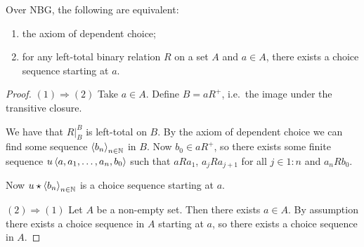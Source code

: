 \begin{lemma} \label{freedomFirstElementChoiceSequence}
Over NBG, the following are equivalent:
\begin{enumerate}
\item the axiom of dependent choice;
\item for any left-total binary relation $R$ on a set $A$ and $a\in A$, there exists a choice sequence starting at $a$.
\end{enumerate}
\end{lemma}
\begin{proof}
$\boxed{(1)\Rightarrow (2)}$ Take $a\in A$. Define $B = aR^+$, i.e.\ the image under the transitive closure.

We have that $R|^B_B$ is left-total on $B$. By the axiom of dependent choice we can find some sequence $\left\langle b_n \right\rangle_{n\in \mathbb{N}}$ in $B$. Now $b_0\in aR^+$, so there exists some finite sequence $u\left\langle a, a_1, \ldots, a_n, b_0 \right\rangle$ such that $aRa_1$,  $a_{j}Ra_{j+1}$ for all $j\in 1:n$ and $a_nRb_0$.

Now $u\star \left\langle b_n \right\rangle_{n\in \mathbb{N}}$ is a choice sequence starting at $a$.

$\boxed{(2)\Rightarrow (1)}$ Let $A$ be a non-empty set. Then there exists $a\in A$. By assumption there exists a choice sequence in $A$ starting at $a$, so there exists a choice sequence in $A$.
\end{proof}

